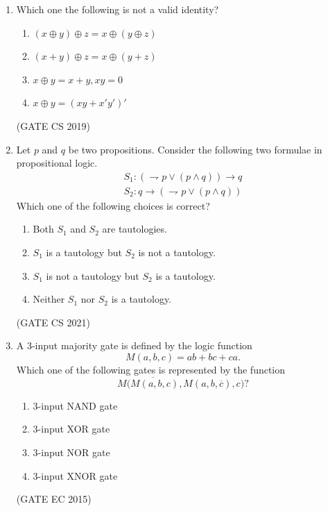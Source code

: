 \begin{enumerate}[label=\arabic*.,ref=\theenumi]
\begin{multicols}{4}
\begin{enumerate}
    \item {}    
    \item {}
\end{enumerate}
	\end{multicols}
%
% 
\item 
Which one the following is not a valid identity?
\begin{enumerate}
 \item $ (x\oplus y)\oplus z = x\oplus (y\oplus z)$
 \item $ (x + y)\oplus z = x\oplus (y + z)$
 \item $ x\oplus y = x + y, xy = 0$
 \item $ x\oplus y = (xy + x'y')'$
\end{enumerate}
\hfill{(GATE CS 2019)}
        \item Let $p$ and $q$ be two propositions. Consider the following two formulae in propositional logic.
			\begin{align*}
				 S_1 : ( \rightharpoondown p \vee (p \wedge q))\rightarrow q \\
				 S_2 : q\rightarrow(\rightharpoondown p \vee (p \wedge q))
			\end{align*}
        Which one of the following choices is correct?
		\begin{enumerate}
			\item Both $S_1$ and $S_2$ are tautologies.
			\item $S_1$ is a tautology but $S_2$ is not a tautology.
			\item $S_1$ is not a tautology but $S_2$ is a tautology.
			\item Neither $S_1$ nor $S_2$ is a tautology.
		\end{enumerate}
		                                          \hfill(GATE CS 2021)
\item A 3-input majority gate is defined by the logic function 
	$$M(a, b, c) = ab + bc + ca.$$ Which one of the following gates is represented by the function $$M\overline{(M(a, b, c)}, M(a, b, \overline{c}), c)?$$
\begin{enumerate}
    \item 3-input NAND gate 
    \item 3-input XOR gate 
    \item 3-input NOR gate 
    \item 3-input XNOR gate 
\end{enumerate}
    \hfill(GATE EC 2015)

\end{enumerate}
